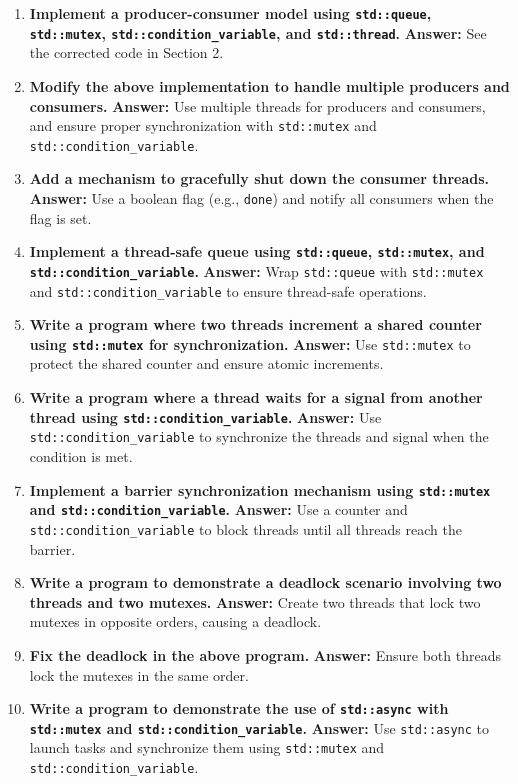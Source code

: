 \documentclass[12pt]{article}
\begin{document}
\begin{enumerate}
    \item \textbf{Implement a producer-consumer model using \texttt{std::queue}, \texttt{std::mutex}, \texttt{std::condition\_variable}, and \texttt{std::thread}.}
    \textbf{Answer:} See the corrected code in Section 2.

    \item \textbf{Modify the above implementation to handle multiple producers and consumers.}
    \textbf{Answer:} Use multiple threads for producers and consumers, and ensure proper synchronization with \texttt{std::mutex} and \texttt{std::condition\_variable}.

    \item \textbf{Add a mechanism to gracefully shut down the consumer threads.}
    \textbf{Answer:} Use a boolean flag (e.g., \texttt{done}) and notify all consumers when the flag is set.

    \item \textbf{Implement a thread-safe queue using \texttt{std::queue}, \texttt{std::mutex}, and \texttt{std::condition\_variable}.}
    \textbf{Answer:} Wrap \texttt{std::queue} with \texttt{std::mutex} and \texttt{std::condition\_variable} to ensure thread-safe operations.

    \item \textbf{Write a program where two threads increment a shared counter using \texttt{std::mutex} for synchronization.}
    \textbf{Answer:} Use \texttt{std::mutex} to protect the shared counter and ensure atomic increments.

    \item \textbf{Write a program where a thread waits for a signal from another thread using \texttt{std::condition\_variable}.}
    \textbf{Answer:} Use \texttt{std::condition\_variable} to synchronize the threads and signal when the condition is met.

    \item \textbf{Implement a barrier synchronization mechanism using \texttt{std::mutex} and \texttt{std::condition\_variable}.}
    \textbf{Answer:} Use a counter and \texttt{std::condition\_variable} to block threads until all threads reach the barrier.

    \item \textbf{Write a program to demonstrate a deadlock scenario involving two threads and two mutexes.}
    \textbf{Answer:} Create two threads that lock two mutexes in opposite orders, causing a deadlock.

    \item \textbf{Fix the deadlock in the above program.}
    \textbf{Answer:} Ensure both threads lock the mutexes in the same order.

    \item \textbf{Write a program to demonstrate the use of \texttt{std::async} with \texttt{std::mutex} and \texttt{std::condition\_variable}.}
    \textbf{Answer:} Use \texttt{std::async} to launch tasks and synchronize them using \texttt{std::mutex} and \texttt{std::condition\_variable}.
\end{enumerate}
\end{document}
